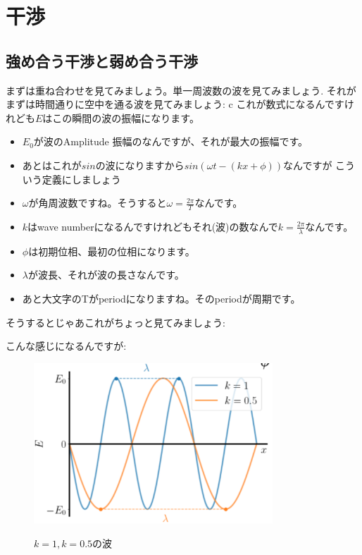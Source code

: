\chapter[干渉]
{干渉}



\section{強め合う干渉と弱め合う干渉}
まずは重ね合わせを見てみましょう。単一周波数の波を見てみましょう.
それがまずは時間通りに空中を通る波を見てみましょう:
c
これが数式になるんですけれども$E$はこの瞬間の波の振幅になります。
\begin{itemize}
    \item $E_0$が波のAmplitude 振幅のなんですが、それが最大の振幅です。
    \item あとはこれが$sin$の波になりますから$sin(\omega t  - (k x + \phi))$なんですが こういう定義にしましょう
    \item $\omega$が角周波数ですね。そうすると$\omega = \frac{2\pi}{T}$なんです。
    \item $k$はwave numberになるんですけれどもそれ(波)の数なんで$k=\frac{2\pi}{\lambda}$なんです。
    \item $\phi$は初期位相、最初の位相になります。
    \item $\lambda$が波長、それが波の長さなんです。
    \item あと大文字のTがperiodになりますね。そのperiodが周期です。

\end{itemize}

そうするとじゃあこれがちょっと見てみましょう:

こんな感じになるんですが:
\begin{figure}[H]
   \centering
    \includegraphics[width=0.8\textwidth]{lesson6/k.pdf}
    \label{fig: 1}
    \begin{center}
        \caption{$k=1, k=0.5$の波}
    \end{center}
\end{figure}

